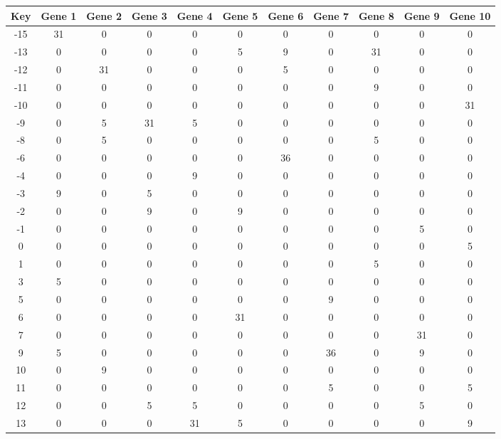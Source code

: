 \begin{tabular}{|c|c|c|c|c|c|c|c|c|c|c|}
\hline
Key & Gene 1 & Gene 2 & Gene 3 & Gene 4 & Gene 5 & Gene 6 & Gene 7 & Gene 8 & Gene 9 & Gene 10 \\
\hline
-15 & 31 & 0 & 0 & 0 & 0 & 0 & 0 & 0 & 0 & 0 \\
-13 & 0 & 0 & 0 & 0 & 5 & 9 & 0 & 31 & 0 & 0 \\
-12 & 0 & 31 & 0 & 0 & 0 & 5 & 0 & 0 & 0 & 0 \\
-11 & 0 & 0 & 0 & 0 & 0 & 0 & 0 & 9 & 0 & 0 \\
-10 & 0 & 0 & 0 & 0 & 0 & 0 & 0 & 0 & 0 & 31 \\
-9 & 0 & 5 & 31 & 5 & 0 & 0 & 0 & 0 & 0 & 0 \\
-8 & 0 & 5 & 0 & 0 & 0 & 0 & 0 & 5 & 0 & 0 \\
-6 & 0 & 0 & 0 & 0 & 0 & 36 & 0 & 0 & 0 & 0 \\
-4 & 0 & 0 & 0 & 9 & 0 & 0 & 0 & 0 & 0 & 0 \\
-3 & 9 & 0 & 5 & 0 & 0 & 0 & 0 & 0 & 0 & 0 \\
-2 & 0 & 0 & 9 & 0 & 9 & 0 & 0 & 0 & 0 & 0 \\
-1 & 0 & 0 & 0 & 0 & 0 & 0 & 0 & 0 & 5 & 0 \\
0 & 0 & 0 & 0 & 0 & 0 & 0 & 0 & 0 & 0 & 5 \\
1 & 0 & 0 & 0 & 0 & 0 & 0 & 0 & 5 & 0 & 0 \\
3 & 5 & 0 & 0 & 0 & 0 & 0 & 0 & 0 & 0 & 0 \\
5 & 0 & 0 & 0 & 0 & 0 & 0 & 9 & 0 & 0 & 0 \\
6 & 0 & 0 & 0 & 0 & 31 & 0 & 0 & 0 & 0 & 0 \\
7 & 0 & 0 & 0 & 0 & 0 & 0 & 0 & 0 & 31 & 0 \\
9 & 5 & 0 & 0 & 0 & 0 & 0 & 36 & 0 & 9 & 0 \\
10 & 0 & 9 & 0 & 0 & 0 & 0 & 0 & 0 & 0 & 0 \\
11 & 0 & 0 & 0 & 0 & 0 & 0 & 5 & 0 & 0 & 5 \\
12 & 0 & 0 & 5 & 5 & 0 & 0 & 0 & 0 & 5 & 0 \\
13 & 0 & 0 & 0 & 31 & 5 & 0 & 0 & 0 & 0 & 9 \\
\hline
\end{tabular}